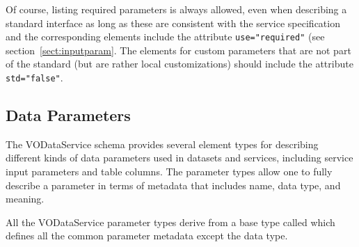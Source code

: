 \documentclass[11pt,a4paper]{ivoa}
\begin{document}
Of course, listing required parameters is always allowed, even when
describing a standard interface as long as these are consistent with
the service specification and the corresponding 
elements include the attribute \verb|use="required"| (see
section~\ref{sect:inputparam}.  The 
elements for custom parameters that are not part of the standard (but
are rather local customizations) should include the attribute
\verb|std="false"|.





\subsection{Data Parameters}
\label{sect:param}


The VODataService schema provides several element types for describing
different kinds of data parameters used in datasets and services,
including service input parameters and table columns.  The parameter
types allow one to fully describe a parameter in terms of metadata
that includes name, data type, and meaning.  


All the VODataService parameter types derive from a base type called
 which defines all the common parameter
metadata except the data type.  
\end{document}
